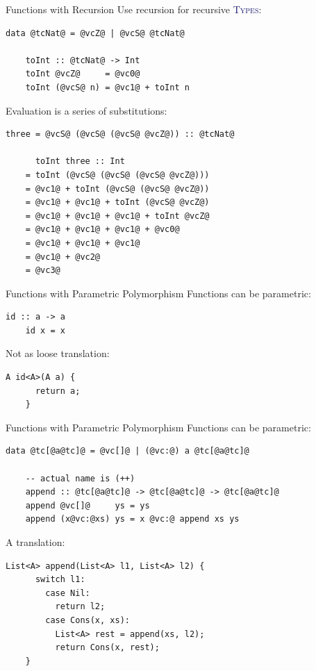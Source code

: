 \documentclass[xcolor={usenames,dvipsnames}]{beamer}
\newcommand{\htycon}[1]{\textcolor{MidnightBlue}{\textsc{#1}}}
\begin{document}
\begin{frame}[fragile]{Functions with Recursion}
  Use recursion for recursive \htycon{Types}:
  \begin{lstlisting}[style=hask]
    data @tcNat@ = @vcZ@ | @vcS@ @tcNat@

    toInt :: @tcNat@ -> Int
    toInt @vcZ@     = @vc0@
    toInt (@vcS@ n) = @vc1@ + toInt n
  \end{lstlisting}

  Evaluation is a series of substitutions:
  \begin{lstlisting}[style=hask]
    three = @vcS@ (@vcS@ (@vcS@ @vcZ@)) :: @tcNat@

      toInt three :: Int
    = toInt (@vcS@ (@vcS@ (@vcS@ @vcZ@)))
    = @vc1@ + toInt (@vcS@ (@vcS@ @vcZ@))
    = @vc1@ + @vc1@ + toInt (@vcS@ @vcZ@)
    = @vc1@ + @vc1@ + @vc1@ + toInt @vcZ@
    = @vc1@ + @vc1@ + @vc1@ + @vc0@
    = @vc1@ + @vc1@ + @vc1@
    = @vc1@ + @vc2@
    = @vc3@
  \end{lstlisting}
\end{frame}

%

\begin{frame}[fragile]{Functions with Parametric Polymorphism}
  Functions can be parametric:
  \begin{lstlisting}[style=hask]
    id :: a -> a
    id x = x
  \end{lstlisting}

  Not as loose translation:
  \begin{lstlisting}[style=hask]
    A id<A>(A a) {
      return a;
    }
  \end{lstlisting}
\end{frame}

\begin{frame}[fragile]{Functions with Parametric Polymorphism}
  Functions can be parametric:
  \begin{lstlisting}[style=hask]
    data @tc[@a@tc]@ = @vc[]@ | (@vc:@) a @tc[@a@tc]@

    -- actual name is (++)
    append :: @tc[@a@tc]@ -> @tc[@a@tc]@ -> @tc[@a@tc]@
    append @vc[]@     ys = ys
    append (x@vc:@xs) ys = x @vc:@ append xs ys
  \end{lstlisting}

  A translation:
  \begin{lstlisting}[style=hask]
    List<A> append(List<A> l1, List<A> l2) {
      switch l1:
        case Nil:
          return l2;
        case Cons(x, xs):
          List<A> rest = append(xs, l2);
          return Cons(x, rest);
    }
  \end{lstlisting}
\end{frame}
\end{document}

